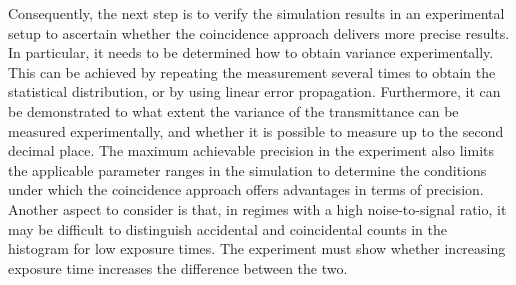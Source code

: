 Consequently, the next step is to verify the simulation results in an experimental setup to ascertain whether the coincidence approach delivers more precise results. In particular, it needs to be determined how to obtain variance experimentally. This can be achieved by repeating the measurement several times to obtain the statistical distribution, or by using linear error propagation.  \newline
Furthermore, it can be demonstrated to what extent the variance of the transmittance can be measured experimentally, and whether it is possible to measure up to the second decimal place. The maximum achievable precision in the experiment also limits the applicable parameter ranges in the simulation to determine the conditions under which the coincidence approach offers advantages in terms of precision. \newline
Another aspect to consider is that, in regimes with a high noise-to-signal ratio, it may be difficult to distinguish accidental and coincidental counts in the histogram for low exposure times. The experiment must show whether increasing exposure time increases the difference between the two. 


